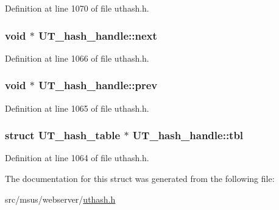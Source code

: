 Definition at line 1070 of file uthash.\-h.

\hypertarget{struct_u_t__hash__handle_ac20c29619fd7716f7ba517a2cd651d27}{
\subsubsection[{next}]{\setlength{\rightskip}{0pt plus 5cm}void $\ast$ U\-T\-\_\-hash\-\_\-handle\-::next}}\label{struct_u_t__hash__handle_ac20c29619fd7716f7ba517a2cd651d27}


Definition at line 1066 of file uthash.\-h.

\hypertarget{struct_u_t__hash__handle_af266811bcd29460133f308987124034e}{
\subsubsection[{prev}]{\setlength{\rightskip}{0pt plus 5cm}void $\ast$ U\-T\-\_\-hash\-\_\-handle\-::prev}}\label{struct_u_t__hash__handle_af266811bcd29460133f308987124034e}


Definition at line 1065 of file uthash.\-h.

\hypertarget{struct_u_t__hash__handle_ad90bfc052210ed0dfe1afcf51f3a89b5}{
\subsubsection[{tbl}]{\setlength{\rightskip}{0pt plus 5cm}struct {\bf U\-T\-\_\-hash\-\_\-table} $\ast$ U\-T\-\_\-hash\-\_\-handle\-::tbl}}\label{struct_u_t__hash__handle_ad90bfc052210ed0dfe1afcf51f3a89b5}


Definition at line 1064 of file uthash.\-h.



The documentation for this struct was generated from the following file\-:\begin{DoxyCompactItemize}
\item 
src/msus/webserver/\hyperlink{msus_2webserver_2uthash_8h}{uthash.\-h}\end{DoxyCompactItemize}
